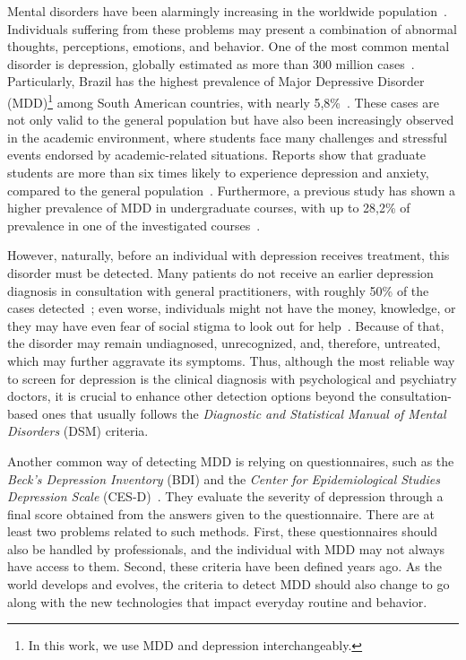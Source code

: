 \documentclass[letterpaper]{article} \usepackage{aaai20}  \usepackage{times}  \usepackage{helvet} \usepackage{courier}  \usepackage[hyphens]{url}  \usepackage{graphicx} \urlstyle{rm} \def\UrlFont{\rm}  \usepackage{graphicx}  \frenchspacing  \setlength{\pdfpagewidth}{8.5in}  \setlength{\pdfpageheight}{11in}  \usepackage[final]{changes}
\begin{document}
Mental disorders have been alarmingly increasing in the worldwide population~\cite{world2017depression}. Individuals suffering from these problems may present a combination of abnormal thoughts, perceptions, emotions, and behavior. One of the most common mental disorder is depression, globally estimated as more than 300 million cases~\cite{world2017depression}. Particularly, Brazil has the highest prevalence of Major Depressive Disorder (MDD)\footnote{In this work, we use MDD and depression interchangeably.} among South American countries, with nearly 5,8\%~\cite{world2017depression}. These cases are not only valid to the general population but have also been increasingly observed in the academic environment, where students face many challenges and stressful events endorsed by academic-related situations. Reports show that graduate students are more than six times likely to experience depression and anxiety, compared to the general population~\cite{evans2018evidence}. Furthermore, a previous study has shown a higher prevalence of MDD in undergraduate courses, with up to 28,2\% of prevalence in one of the investigated courses~\cite{de2006prevalencia}. 

However, naturally, before an individual with depression receives treatment, this disorder must be detected. Many patients do not receive an earlier depression diagnosis in consultation with general practitioners, with roughly 50\% of the cases detected~\cite{kessler2002detection,mitchell2009clinical}; even worse, individuals might not have the money, knowledge, or they may have even fear of social stigma to look out for help~\cite{andrade2014barriers,roness2005help}. Because of that, the disorder may remain undiagnosed, unrecognized, and, therefore, untreated, which may further aggravate its symptoms. Thus, although the most reliable way to screen for depression is the clinical diagnosis with psychological and psychiatry doctors, it is crucial to enhance other detection options beyond the consultation-based ones that usually follows the \textit{Diagnostic and Statistical Manual of Mental Disorders} (DSM) criteria. 

Another common way of detecting MDD is relying on questionnaires, such as the \textit{Beck's Depression Inventory} (BDI) and the \textit{Center for Epidemiological Studies Depression Scale} (CES-D)~\cite{beck1996beck,radloff1977ces}. They evaluate the severity of depression through a final score obtained from the answers given to the questionnaire. There are at least two problems related to such methods. First, these questionnaires should also be handled by professionals, and the individual with MDD may not always have access to them. Second, these criteria have been defined years ago. As the world develops and evolves, the criteria to detect MDD should also change to go along with the new technologies that impact everyday routine and behavior. 
\end{document}
